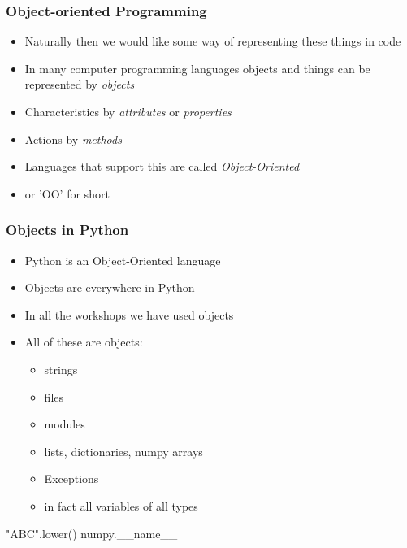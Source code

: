 \documentclass{beamer}
\begin{document}
\begin{frame}[fragile]
\frametitle{Object-oriented Programming}

\begin{itemize}
\item Naturally then we would like some way of representing these things in code
\item In many computer programming languages objects and things can be represented by \emph{objects}
\item Characteristics by \emph{attributes} or \emph{properties}
\item Actions by \emph{methods}
\item Languages that support this are called \emph{Object-Oriented}
\item or 'OO' for short
\end{itemize}

\end{frame}

\begin{frame}[fragile]
\frametitle{Objects in Python}
\begin{itemize}
\item Python is an Object-Oriented language
\item Objects are everywhere in Python
\item In all the workshops we have used objects
\item All of these are objects:
\begin{itemize}
\item strings
\item files
\item modules
\item lists, dictionaries, numpy arrays
\item Exceptions
\item in fact all variables of all types
\end{itemize}
\end{itemize}
\begin{code}
"ABC".lower()
numpy.__name__
\end{code}
\end{frame}
\end{document}
